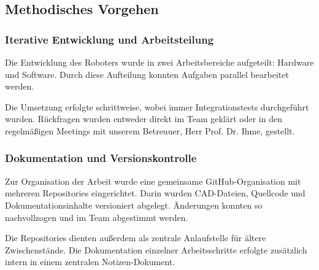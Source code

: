 \subsection{Methodisches Vorgehen}

\subsubsection{Iterative Entwicklung und Arbeitsteilung}

Die Entwicklung des Roboters wurde in zwei Arbeitsbereiche aufgeteilt: Hardware und Software. Durch diese Aufteilung konnten Aufgaben parallel bearbeitet werden.

Die Umsetzung erfolgte schrittweise, wobei immer Integrationstests durchgeführt wurden. Rückfragen wurden entweder direkt im Team geklärt oder in den regelmäßigen Meetings mit unserem Betreuuer, Herr Prof. Dr. Ihme, gestellt. 

\subsubsection{Dokumentation und Versionskontrolle}

Zur Organisation der Arbeit wurde eine gemeinsame GitHub-Organisation mit mehreren Repositories eingerichtet. Darin wurden CAD-Dateien, Quellcode und Dokumentationsinhalte versioniert abgelegt. Änderungen konnten so nachvollzogen und im Team abgestimmt werden.

Die Repositories dienten außerdem als zentrale Anlaufstelle für ältere Zwischenstände. Die Dokumentation einzelner Arbeitsschritte erfolgte zusätzlich intern in einem zentralen Notizen-Dokument.
